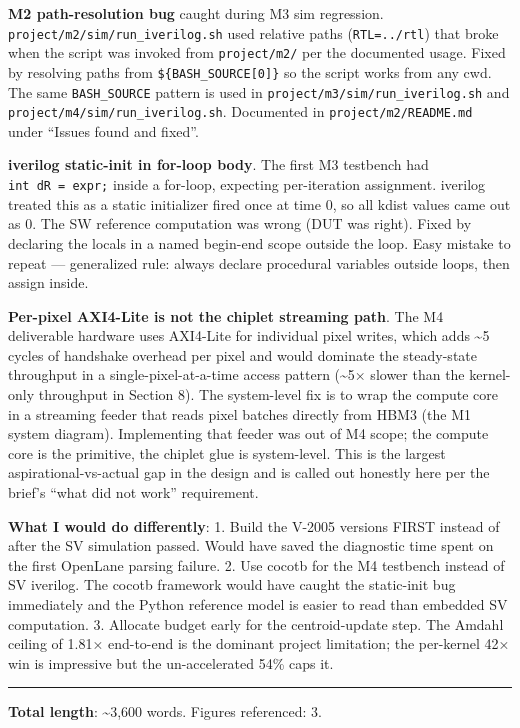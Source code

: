 \documentclass[
  10pt,
]{article}
\begin{document}
\textbf{M2 path-resolution bug} caught during M3 sim regression.
\texttt{project/m2/sim/run\_iverilog.sh} used relative paths
(\texttt{RTL=../rtl}) that broke when the script was invoked from
\texttt{project/m2/} per the documented usage. Fixed by resolving paths
from \texttt{\$\{BASH\_SOURCE{[}0{]}\}} so the script works from any
cwd. The same \texttt{BASH\_SOURCE} pattern is used in
\texttt{project/m3/sim/run\_iverilog.sh} and
\texttt{project/m4/sim/run\_iverilog.sh}. Documented in
\texttt{project/m2/README.md} under ``Issues found and fixed''.

\textbf{iverilog static-init in for-loop body}. The first M3 testbench
had \texttt{int\ dR\ =\ expr;} inside a for-loop, expecting
per-iteration assignment. iverilog treated this as a static initializer
fired once at time 0, so all kdist values came out as 0. The SW
reference computation was wrong (DUT was right). Fixed by declaring the
locals in a named begin-end scope outside the loop. Easy mistake to
repeat --- generalized rule: always declare procedural variables outside
loops, then assign inside.

\textbf{Per-pixel AXI4-Lite is not the chiplet streaming path}. The M4
deliverable hardware uses AXI4-Lite for individual pixel writes, which
adds \textasciitilde5 cycles of handshake overhead per pixel and would
dominate the steady-state throughput in a single-pixel-at-a-time access
pattern (\textasciitilde5× slower than the kernel-only throughput in
Section 8). The system-level fix is to wrap the compute core in a
streaming feeder that reads pixel batches directly from HBM3 (the M1
system diagram). Implementing that feeder was out of M4 scope; the
compute core is the primitive, the chiplet glue is system-level. This is
the largest aspirational-vs-actual gap in the design and is called out
honestly here per the brief's ``what did not work'' requirement.

\textbf{What I would do differently}: 1. Build the V-2005 versions FIRST
instead of after the SV simulation passed. Would have saved the
diagnostic time spent on the first OpenLane parsing failure. 2. Use
cocotb for the M4 testbench instead of SV iverilog. The cocotb framework
would have caught the static-init bug immediately and the Python
reference model is easier to read than embedded SV computation. 3.
Allocate budget early for the centroid-update step. The Amdahl ceiling
of 1.81× end-to-end is the dominant project limitation; the per-kernel
42× win is impressive but the un-accelerated 54\% caps it.

\begin{center}\rule{0.5\linewidth}{0.5pt}\end{center}

\textbf{Total length}: \textasciitilde3,600 words. Figures referenced:
3.
\end{document}

